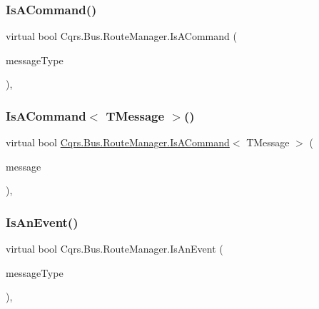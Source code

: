 \subsubsection{\texorpdfstring{Is\+A\+Command()}{IsACommand()}}
{\footnotesize\ttfamily virtual bool Cqrs.\+Bus.\+Route\+Manager.\+Is\+A\+Command (\begin{DoxyParamCaption}\item[{Type}]{message\+Type }\end{DoxyParamCaption})\hspace{0.3cm}{\ttfamily [protected]}, {\ttfamily [virtual]}}

\mbox{\label{classCqrs_1_1Bus_1_1RouteManager_a1ee8d583bb5d75a54cdac03c8e84b8d9_a1ee8d583bb5d75a54cdac03c8e84b8d9}} 
\subsubsection{\texorpdfstring{Is\+A\+Command$<$ T\+Message $>$()}{IsACommand< TMessage >()}}
{\footnotesize\ttfamily virtual bool \hyperlink{classCqrs_1_1Bus_1_1RouteManager_a7b7bfc4db30cc5956c4acd6a342e9159_a7b7bfc4db30cc5956c4acd6a342e9159}{Cqrs.\+Bus.\+Route\+Manager.\+Is\+A\+Command}$<$ T\+Message $>$ (\begin{DoxyParamCaption}\item[{T\+Message}]{message }\end{DoxyParamCaption})\hspace{0.3cm}{\ttfamily [protected]}, {\ttfamily [virtual]}}

\mbox{\label{classCqrs_1_1Bus_1_1RouteManager_a7b9b2ad8b9f5d7761b0f45c033b96101_a7b9b2ad8b9f5d7761b0f45c033b96101}} 
\subsubsection{\texorpdfstring{Is\+An\+Event()}{IsAnEvent()}}
{\footnotesize\ttfamily virtual bool Cqrs.\+Bus.\+Route\+Manager.\+Is\+An\+Event (\begin{DoxyParamCaption}\item[{Type}]{message\+Type }\end{DoxyParamCaption})\hspace{0.3cm}{\ttfamily [protected]}, {\ttfamily [virtual]}}


